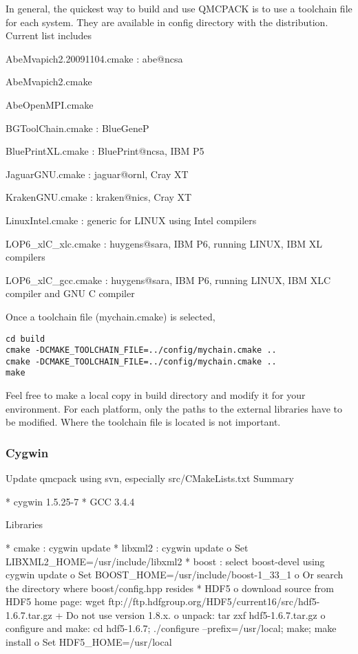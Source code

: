 In general, the quickest way to build and use QMCPACK is to use a toolchain file for each system. They are available in config directory with the distribution. Current list includes
\begin{itemize*}
\item{} AbeMvapich2.20091104.cmake : abe@ncsa
\item{} AbeMvapich2.cmake
\item{} AbeOpenMPI.cmake
\item{} BGToolChain.cmake : BlueGeneP
\item{} BluePrintXL.cmake : BluePrint@ncsa, IBM P5
\item{} JaguarGNU.cmake : jaguar@ornl, Cray XT
\item{} KrakenGNU.cmake : kraken@nics, Cray XT
\item{} LinuxIntel.cmake : generic for LINUX using Intel compilers
\item{} LOP6\_xlC\_xlc.cmake : huygens@sara, IBM P6, running LINUX, IBM XL compilers
\item{} LOP6\_xlC\_gcc.cmake : huygens@sara, IBM P6, running LINUX, IBM XLC compiler and GNU C compiler
\end{itemize*}
Once a toolchain file (mychain.cmake)  is selected,
\begin{verbatim}
cd build
cmake -DCMAKE_TOOLCHAIN_FILE=../config/mychain.cmake ..
cmake -DCMAKE_TOOLCHAIN_FILE=../config/mychain.cmake ..
make
\end{verbatim}
Feel free to make a local copy in build directory and modify it for your environment. For each platform, only the paths to the external libraries have to be modified. Where the toolchain file is located is not important.

\subsubsection{Cygwin}
Update qmcpack using svn, especially src/CMakeLists.txt
 Summary

    * cygwin 1.5.25-7
    * GCC 3.4.4 

 Libraries

    * cmake : cygwin update
    * libxml2 : cygwin update
          o Set LIBXML2\_HOME=/usr/include/libxml2 
    * boost : select boost-devel using cygwin update
          o Set BOOST\_HOME=/usr/include/boost-1\_33\_1
          o Or search the directory where boost/config.hpp resides 
    * HDF5
          o download source from HDF5 home page:
            wget ftp://ftp.hdfgroup.org/HDF5/current16/src/hdf5-1.6.7.tar.gz
                + Do not use version 1.8.x. 
          o unpack:
            tar zxf hdf5-1.6.7.tar.gz
          o configure and make:
            cd hdf5-1.6.7; ./configure --prefix=/usr/local; make; make install
          o Set HDF5\_HOME=/usr/local 

